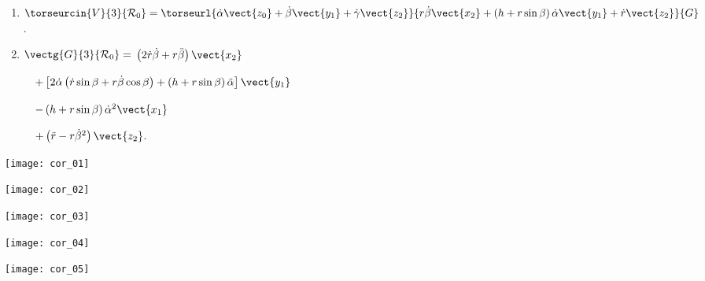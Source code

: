 \ifprof
\begin{enumerate}
\item $\torseurcin{V}{3}{\mathcal{R}_0}=\torseurl{\dot{\alpha}\vect{z_0}+\dot{\beta}\vect{y_1}+\dot{\gamma}\vect{z_2}}{r\dot{\beta}\vect{x_2}+\left( h+r\sin \beta \right)\dot{\alpha}\vect{y_1}+\dot{r}\vect{z_2}}{G}$.
\item $\vectg{G}{3}{\mathcal{R}_0}=$
$\left(2\dot{r}\dot{\beta}+r\ddot{\beta} \right)\vect{x_2}$

$\quad +\left[2\dot{\alpha}\left( \dot{r}\sin\beta +r\dot{\beta} \cos \beta \right) + \left(h+r\sin\beta \right)\ddot{ \alpha}\right]\vect{y_1}$

$\quad -\left(h+r\sin\beta \right)\dot{\alpha}^2\vect{x_1}$

$\quad +\left(\ddot{r}-r\dot{\beta}^2 \right)\vect{z_2}$.
\end{enumerate}
\else
\fi

\newpage

\ifprof
\begin{center}
\texttt{[image: cor\_01]}
\end{center}
\begin{center}
\texttt{[image: cor\_02]}
\end{center}
\begin{center}
\texttt{[image: cor\_03]}
\end{center}
\begin{center}
\texttt{[image: cor\_04]}
\end{center}
\begin{center}
\texttt{[image: cor\_05]}
\end{center}
\else
\fi



